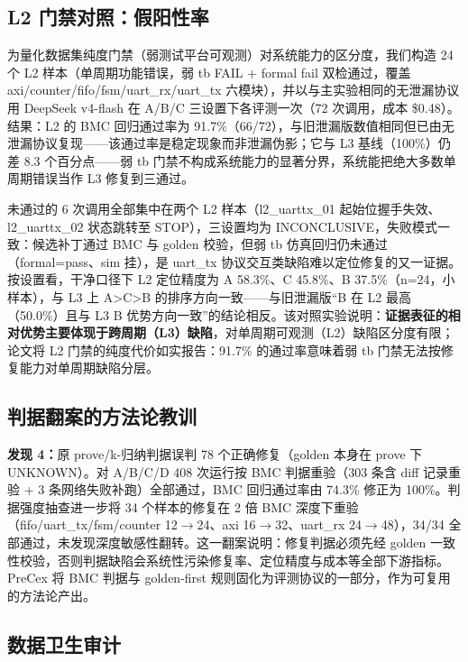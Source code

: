 \documentclass[journal]{IEEEtran}
\begin{document}
\subsection{L2 门禁对照：假阳性率}\label{sec:l2}

为量化数据集纯度门禁（弱测试平台可观测）对系统能力的区分度，我们构造 24 个 L2 样本（单周期功能错误，弱 tb FAIL + formal fail 双检通过，覆盖 axi/counter/fifo/fsm/uart\_rx/uart\_tx 六模块），并以与主实验相同的无泄漏协议用 DeepSeek v4-flash 在 A/B/C 三设置下各评测一次（72 次调用，成本 \$0.48）。结果：L2 的 BMC 回归通过率为 91.7\%（66/72），与旧泄漏版数值相同但已由无泄漏协议复现——该通过率是稳定现象而非泄漏伪影；它与 L3 基线（100\%）仍差 8.3 个百分点——弱 tb 门禁不构成系统能力的显著分界，系统能把绝大多数单周期错误当作 L3 修复到三通过。

未通过的 6 次调用全部集中在两个 L2 样本（l2\_uarttx\_01 起始位握手失效、l2\_uarttx\_02 状态跳转至 STOP），三设置均为 INCONCLUSIVE，失败模式一致：候选补丁通过 BMC 与 golden 校验，但弱 tb 仿真回归仍未通过（formal=pass、sim 挂），是 uart\_tx 协议交互类缺陷难以定位修复的又一证据。按设置看，干净口径下 L2 定位精度为 A 58.3\%、C 45.8\%、B 37.5\%（n=24，小样本），与 L3 上 A>C>B 的排序方向一致——与旧泄漏版“B 在 L2 最高（50.0\%）且与 L3 B 优势方向一致”的结论相反。该对照实验说明：\textbf{证据表征的相对优势主要体现于跨周期（L3）缺陷}，对单周期可观测（L2）缺陷区分度有限；论文将 L2 门禁的纯度代价如实报告：91.7\% 的通过率意味着弱 tb 门禁无法按修复能力对单周期缺陷分层。
\subsection{判据翻案的方法论教训}\label{sec:judgment}

\textbf{发现 4：}原 prove/k-归纳判据误判 78 个正确修复（golden 本身在 prove 下 UNKNOWN）。对 A/B/C/D 408 次运行按 BMC 判据重验（303 条含 diff 记录重验 + 3 条网络失败补跑）全部通过，BMC 回归通过率由 74.3\% 修正为 100\%。判据强度抽查进一步将 34 个样本的修复在 2 倍 BMC 深度下重验（fifo/uart\_tx/fsm/counter 12$\to$24、axi 16$\to$32、uart\_rx 24$\to$48），34/34 全部通过，未发现深度敏感性翻转。这一翻案说明：修复判据必须先经 golden 一致性校验，否则判据缺陷会系统性污染修复率、定位精度与成本等全部下游指标。PreCex 将 BMC 判据与 golden-first 规则固化为评测协议的一部分，作为可复用的方法论产出。

\subsection{数据卫生审计}\label{sec:hygiene}
\end{document}
